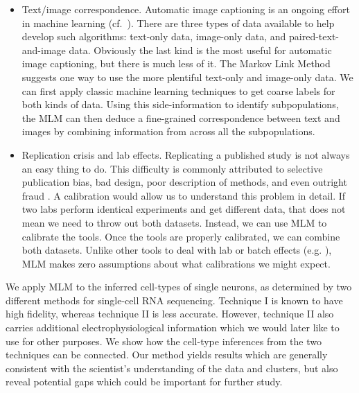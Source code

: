 \begin{itemize}
    \item Text/image correspondence.  Automatic image captioning is an ongoing effort in machine learning (cf.\ \cite{srivastava2018survey}).  There are three types of data available to help develop such algorithms: text-only data, image-only data, and paired-text-and-image data.  Obviously the last kind is the most useful for automatic image captioning, but there is much less of it.  The Markov Link Method suggests one way to use the more plentiful text-only and image-only data.  We can first apply classic machine learning techniques to get coarse labels for both kinds of data.  Using this side-information to identify subpopulations, the MLM can then deduce a fine-grained correspondence between text and images by combining information from across all the subpopulations.

    \item Replication crisis and lab effects.  Replicating a published study is not always an easy thing to do.  This difficulty is commonly attributed to selective publication bias, bad design, poor description of methods, and even outright fraud \cite{baker2016reproducibility}.  A calibration would allow us to understand this problem in detail.  If two labs perform identical experiments and get different data, that does not mean we need to throw out both datasets.  Instead, we can use MLM to calibrate the tools.  Once the tools are properly calibrated, we can combine both datasets.  Unlike other tools to deal with lab or batch effects (e.g. \cite{crow2018characterizing,johnson2007adjusting}), MLM makes zero assumptions about what calibrations we might expect.
\end{itemize}

We apply MLM to the inferred cell-types of single neurons, as determined by two different methods for single-cell RNA sequencing.  Technique I is known to have high fidelity, whereas technique II is less accurate.  However, technique II also carries additional electrophysiological information which we would later like to use for other purposes.  We show how the cell-type inferences from the two techniques can be connected.  Our method yields results which are generally consistent with the scientist's understanding of the data and clusters, but also reveal potential gaps which could be important for further study.

